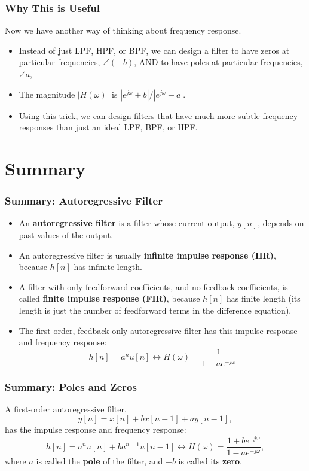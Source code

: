 \documentclass{beamer}
\begin{document}
\begin{frame}
  \centerline{}
\end{frame}

\begin{frame}
  \frametitle{Why This is Useful}

  Now we have another way of thinking about frequency response.
  \begin{itemize}
    \item Instead of just LPF, HPF, or BPF, we can design a filter to have
      zeros at particular frequencies, $\angle (-b)$, AND to have
      poles at particular frequencies, $\angle a$,
    \item The magnitude $|H(\omega)|$ is
      $|e^{j\omega}+b|/|e^{j\omega}-a|$.
    \item Using this trick, we can design filters that have much more
      subtle frequency responses than just an ideal LPF, BPF, or HPF.
  \end{itemize}
\end{frame}


\section[Summary]{Summary}
\setcounter{subsection}{1}

\begin{frame}
  \frametitle{Summary: Autoregressive Filter}
  \begin{itemize}
  \item An {\bf autoregressive filter} is a filter whose current output,
    $y[n]$, depends on  past values of the output.
  \item An autoregressive filter is usually {\bf infinite impulse response (IIR)},
    because $h[n]$ has infinite length.
  \item A filter with only feedforward coefficients, and no feedback coefficients, is called
    {\bf finite impulse response (FIR)}, because $h[n]$ has finite length (its length is
    just the number of feedforward terms in the difference equation).
  \item The first-order, feedback-only autoregressive filter has this
    impulse response and frequency response:
    \[
    h[n]=a^n u[n] \leftrightarrow H(\omega)  = \frac{1}{1-ae^{-j\omega}}
    \]
  \end{itemize}
\end{frame}
\begin{frame}
  \frametitle{Summary: Poles and Zeros}
  A first-order autoregressive filter,
  \[
  y[n] = x[n]+bx[n-1]+ay[n-1],
  \]
  has the impulse response and frequency response:
  \[
  h[n]=a^n u[n]+ba^{n-1}u[n-1] \leftrightarrow H(\omega)  = \frac{1+be^{-j\omega}}{1-ae^{-j\omega}},
  \]
  where $a$ is called the {\bf pole} of the filter, and $-b$ is called
  its {\bf zero}.
\end{frame}
\end{document}
